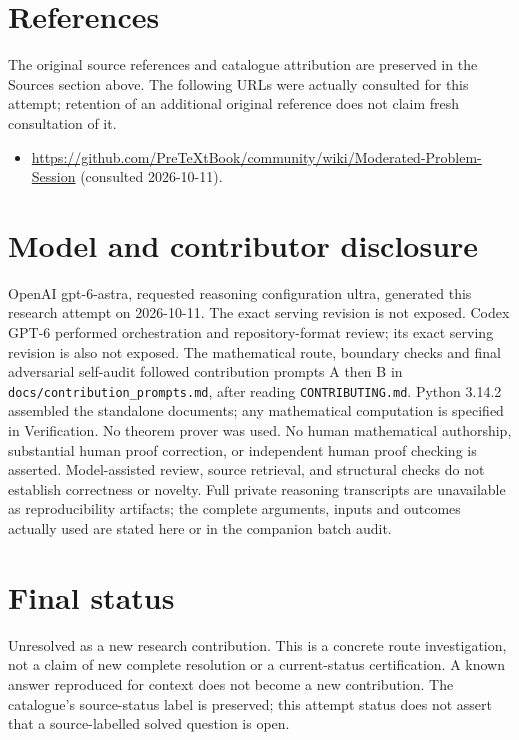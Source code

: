\documentclass[11pt]{article}
\begin{document}
\section{References}
The original source references and catalogue attribution are preserved in the
Sources section above. The following URLs were actually consulted for this attempt;
retention of an additional original reference does not claim fresh consultation of it.
\begin{itemize}
\item \url{https://github.com/PreTeXtBook/community/wiki/Moderated-Problem-Session} (consulted 2026-10-11). 
\end{itemize}
\section{Model and contributor disclosure}
OpenAI gpt-6-astra, requested reasoning configuration ultra, generated this research
attempt on 2026-10-11. The exact serving revision is not exposed. Codex GPT-6
performed orchestration and repository-format review; its exact serving revision
is also not exposed. The mathematical route, boundary checks and final adversarial
self-audit followed contribution prompts A then B in
\texttt{docs/contribution\_prompts.md}, after reading \texttt{CONTRIBUTING.md}.
Python 3.14.2 assembled the standalone documents; any mathematical computation is
specified in Verification. No theorem prover was used. No human mathematical
authorship, substantial human proof correction, or independent human proof checking
is asserted. Model-assisted review, source retrieval, and structural checks do not
establish correctness or novelty. Full private reasoning transcripts are unavailable
as reproducibility artifacts; the complete arguments, inputs and outcomes actually
used are stated here or in the companion batch audit.
\section{Final status}
Unresolved as a new research contribution. This is a concrete route investigation,
not a claim of new complete resolution or a current-status certification. A known
answer reproduced for context does not become a new contribution. The catalogue's
source-status label is preserved; this attempt status does not assert that a
source-labelled solved question is open.
\end{document}
